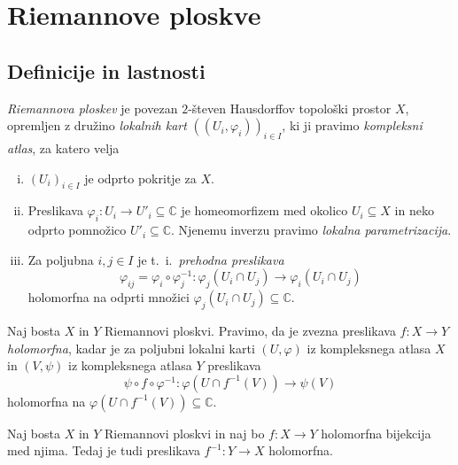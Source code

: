 \documentclass[mat1]{fmfdelo}
\newcommand{\C}{\mathbb C}
\newcommand{\inv}{^{-1}}
\theoremstyle{definition}
\begin{document}
\section{Riemannove ploskve} \label{riemannove ploskve}
\subsection{Definicije in lastnosti}


\begin{definicija}
    \emph{Riemannova ploskev} je povezan $2$-števen Hausdorffov topološki prostor $X$, opremljen z družino \emph{lokalnih kart} $((U_i, \varphi_i))_{i \in I}$, ki ji pravimo \emph{kompleksni atlas}, za katero velja
    \begin{enumerate}[(i)]
        \item $(U_i)_{i \in I}$ je odprto pokritje za $X$.
        \item Preslikava $\varphi_i : U_i \to U'_i \subseteq \C$ je homeomorfizem med okolico $U_i \subseteq X$ in neko odprto pomnožico $U'_i \subseteq \C$. Njenemu inverzu pravimo \emph{lokalna parametrizacija}.
        \item Za poljubna $i,j \in I$ je t.~i.\ \emph{prehodna preslikava}
        \[
            \varphi_{ij} = \varphi_i \circ \varphi_j\inv : \varphi_j(U_i \cap U_j) \to \varphi_i(U_i \cap U_j)   
        \]
        holomorfna na odprti množici $\varphi_j(U_i \cap U_j) \subseteq \C$.
    \end{enumerate}
\end{definicija}

\begin{zgled*}
    
\end{zgled*}

\begin{definicija}
    Naj bosta $X$ in $Y$ Riemannovi ploskvi. Pravimo, da je zvezna preslikava $f:X \to Y$ \emph{holomorfna}, kadar je za poljubni lokalni karti $(U, \varphi)$ iz kompleksnega atlasa $X$ in $(V, \psi)$ iz kompleksnega atlasa $Y$ preslikava
    \[
        \psi \circ f \circ \varphi\inv : \varphi(U \cap f\inv(V)) \to \psi(V)
    \]
    holomorfna na $\varphi(U \cap f\inv(V)) \subseteq \C$.
\end{definicija}

\begin{trditev}
    \label{holomorfna bijekcija je biholomorfizem}
    Naj bosta $X$ in $Y$ Riemannovi ploskvi in naj bo $f: X \to Y$ holomorfna bijekcija med njima. Tedaj je tudi preslikava $f\inv : Y \to X$ holomorfna.
\end{trditev}
\end{document}
